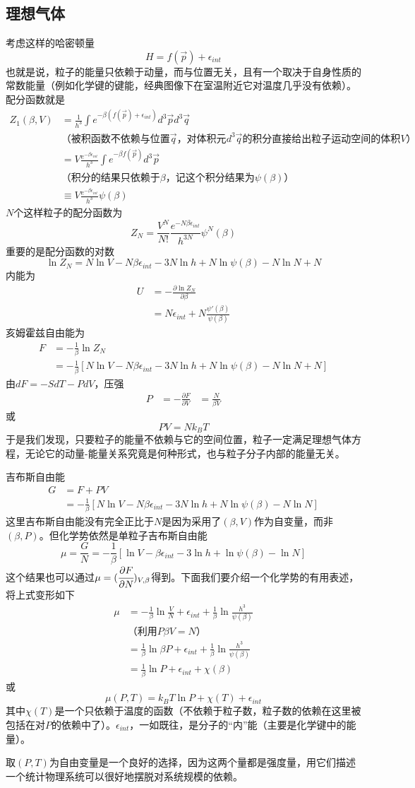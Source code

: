 \documentclass[a4paper,11pt]{ctexart}
\newcommand{\beq}{\begin{equation}}
\newcommand{\eeq}{\end{equation}}
\newcommand{\bea}{\begin{equation}\begin{aligned}}
\newcommand{\eea}{\end{aligned}\end{equation}}
\newcommand{\red}{\color{red}}
\begin{document}
\subsection{理想气体}
考虑这样的哈密顿量
\beq
H = f(\vec{p}) + \epsilon_{int}
\eeq
也就是说，粒子的能量只依赖于动量，而与位置无关，且有一个取决于自身性质的常数能量（例如化学键的键能，经典图像下在室温附近它对温度几乎没有依赖）。配分函数就是
\bea
Z_1 (\beta,V) &= \frac{1}{h^3} \int e^{-\beta (f(\vec{p}) + \epsilon_{int})}d^3 \vec{p} d^3 \vec{q} \\
&\text{（被积函数不依赖与位置$\vec{q}$，对体积元$d^3 \vec{q}$的积分直接给出粒子运动空间的体积$V$）} \\
& = V \frac{e^{-\beta \epsilon_{int}}}{h^3} \int e^{-\beta f(\vec{p})} d^3 \vec{p} \\
&\text{（积分的结果只依赖于$\beta$，记这个积分结果为$\psi(\beta)$）} \\
&\equiv V \frac{e^{-\beta \epsilon_{int}}}{h^3} \psi(\beta)
\eea
$N$个这样粒子的配分函数为
\beq
Z_N = \frac{V^N}{N!} \frac{e^{-N\beta \epsilon_{int}}}{h^{3N}} \psi^N(\beta)
\eeq
重要的是配分函数的对数
\beq
\ln Z_N = N\ln V - N\beta \epsilon_{int} - 3N\ln h + N \ln \psi(\beta) - N\ln N + N
\eeq
内能为
\bea
U &= - \frac{\partial \ln Z_N}{\partial \beta} \\
&= N\epsilon_{int} + N \frac{\psi'(\beta)}{\psi(\beta)}
\eea
亥姆霍兹自由能为
\bea
F &= -\frac{1}{\beta} \ln Z_N \\
&=  -\frac{1}{\beta}[N\ln V - N\beta \epsilon_{int} - 3N\ln h + N \ln \psi(\beta) - N\ln N + N]
\eea
由$dF = -SdT - PdV$，压强
\bea
P &= - \frac{\partial F}{\partial V}
&= \frac{N}{\beta V}
\eea
或
\beq
PV = Nk_B T
\eeq
于是我们发现，{\red 只要粒子的能量不依赖与它的空间位置，粒子一定满足理想气体方程，无论它的动量-能量关系究竟是何种形式，也与粒子分子内部的能量无关}。
\par
吉布斯自由能
\bea
G &= F + PV \\
&=  -\frac{1}{\beta}[N\ln V - N\beta \epsilon_{int} - 3N\ln h + N \ln \psi(\beta) - N\ln N]
\eea
这里吉布斯自由能没有完全正比于$N$是因为采用了$(\beta,V)$作为自变量，而非$(\beta,P)$。但化学势依然是单粒子吉布斯自由能
\beq
\mu = \frac{G}{N} = -\frac{1}{\beta}[\ln V - \beta \epsilon_{int} - 3\ln h +  \ln \psi(\beta) - \ln N]
\eeq
这个结果也可以通过$\mu = (\cfrac{\partial F}{\partial N})_{V,\beta}$得到。下面我们要介绍一个化学势的有用表述，将上式变形如下
\bea
\mu &= -\frac{1}{\beta}\ln \frac{V}{N} + \epsilon_{int} + \frac{1}{\beta}\ln \frac{h^3}{\psi(\beta)} \\
&\text{（利用$P\beta V = N$）} \\
&=\frac{1}{\beta}\ln \beta P + \epsilon_{int} + \frac{1}{\beta}\ln \frac{h^3}{\psi(\beta)} \\
&=\frac{1}{\beta}\ln P + \epsilon_{int} + \chi(\beta)
\eea
或
\beq
\mu(P,T) = k_B T \ln P + \chi(T)+ \epsilon_{int}
\eeq
其中$\chi(T)$是一个只依赖于温度的函数（不依赖于粒子数，粒子数的依赖在这里被包括在对$P$的依赖中了）。$\epsilon_{int}$，一如既往，是分子的“内”能（主要是化学键中的能量）。
\par
取$(P,T)$为自由变量是一个良好的选择，因为这两个量都是强度量，用它们描述一个统计物理系统可以很好地摆脱对系统规模的依赖。
\end{document}
